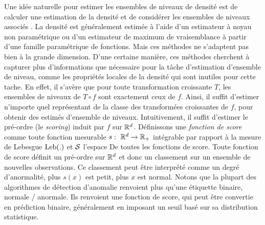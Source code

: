 
Une idée naturelle pour estimer les ensembles de niveaux de densité est de calculer une estimation de la densité et de considérer les ensembles de niveaux associés \citep{Tsybakov1997, Cuevas1997, Baillo2001, Baillo2003, Cadre2006, Rigollet2009, Mason2009}.
La densité est généralement estimée à l'aide d'un estimateur à noyau non paramétrique ou d'un estimateur de maximum de vraisemblance à partir d'une famille paramétrique de fonctions. Mais ces méthodes ne s'adaptent pas bien à la  grande dimension. D'une certaine manière, ces méthodes cherchent à capturer plus d'informations que nécessaire pour la tâche d'estimation d'ensemble de niveau, comme les propriétés locales de la densité qui sont inutiles pour cette tache. En effet, il s'avère que pour toute transformation croissante $ T $, les ensembles de niveaux de $ T \circ f $ sont exactement ceux de $ f $. Ainsi, il suffit d'estimer n'importe quel représentant de la classe des transformées croissantes de $ f $, pour obtenir des estimés d'ensemble de niveaux. Intuitivement, il suffit d'estimer le pré-ordre (le \emph {scoring}) induit par $ f $ sur $ \rset ^ d $. Définissons une \emph {fonction de score} comme toute fonction mesurable $ s: ~ \rset ^ d \to \rset _ + $ intégrable par rapport à la mesure de Lebesgue $ \leb (.) $ et $ \S $ l'espace De toutes les fonctions de score.
Toute fonction de score définit un pré-ordre sur $ \rset ^ d $ et donc un classement sur un ensemble de nouvelles observations. Ce classement peut être interprété comme un degré d'anormalité, plus $ s (x) $ est petit, plus $ x $ est normal. Notons que la plupart des algorithmes de détection d'anomalie renvoient plus qu'une étiquette binaire, normale / anormale. Ils renvoient une fonction de score, qui peut être convertie en prédiction binaire, généralement en imposant un seuil basé sur sa distribution statistique.


